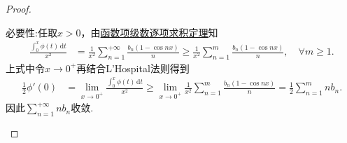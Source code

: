 \documentclass[../../main.tex]{subfiles}
\begin{document}
\begin{proof}
\begin{enumerate}
{\heiti 必要性:}任取\( x > 0 \)，由\hyperref[theorem:函数项级数逐项求积定理]{函数项级数逐项求积定理}知
\begin{align*}
\frac{\int_{0}^{x} \phi(t) \, \mathrm{d}t}{x^2} &= \frac{1}{x^2} \sum_{n=1}^{+\infty} \frac{b_n (1 - \cos nx)}{n} \geqslant \frac{1}{x^2} \sum_{n=1}^{m} \frac{b_n (1 - \cos nx)}{n}, \quad \forall m \geqslant 1.
\end{align*}
上式中令\( x \to 0^+ \)再结合L'Hospital法则得到
\begin{align*}
\frac{1}{2} \phi'(0) &= \lim_{x \to 0^+} \frac{\int_{0}^{x} \phi(t) \, \mathrm{d}t}{x^2} \geqslant \lim_{x \to 0^+} \frac{1}{x^2} \sum_{n=1}^{m} \frac{b_n (1 - \cos nx)}{n} = \frac{1}{2} \sum_{n=1}^{m} nb_n.
\end{align*}
因此\( \sum_{n=1}^{+\infty} nb_n \)收敛.
\end{enumerate}

\end{proof}
\end{document}
